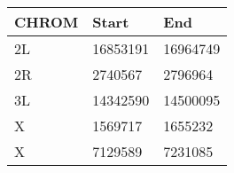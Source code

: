 \centering \begin{tabular}{l|l|l}
CHROM	&Start	&End\\\hline
2L	&16853191	&16964749\\
2R	&2740567	&2796964\\
3L	&14342590	&14500095\\
X	&1569717	&1655232\\
X	&7129589	&7231085\\
\end{tabular}

